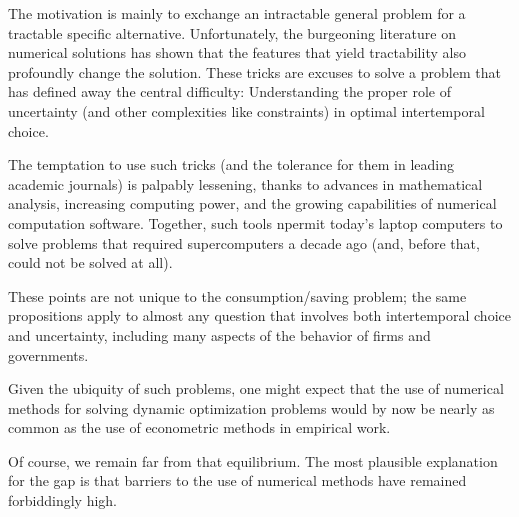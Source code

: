 \documentclass[titlepage]{\econtex}
\begin{document}
The motivation is mainly to exchange an intractable general problem
for a tractable specific alternative.  Unfortunately, the burgeoning
literature on numerical solutions has shown that the features that
yield tractability also profoundly change the solution.  These tricks
are excuses to solve a problem that has defined away the central
difficulty: Understanding the proper role of uncertainty (and other
complexities like constraints) in optimal intertemporal choice.

The temptation to use such tricks (and the tolerance for them in
leading academic journals) is palpably lessening, thanks to advances in
mathematical analysis, increasing computing power, and the growing
capabilities of numerical computation software.  Together, such tools
npermit today's laptop computers to solve problems that required
supercomputers a decade ago (and, before that, could not be solved at
all).

These points are not unique to the consumption/saving problem; the
same propositions apply to almost any question that involves both
intertemporal choice and uncertainty, including many aspects of the
behavior of firms and governments.  

Given the ubiquity of such problems, one might expect that the use of
numerical methods for solving dynamic optimization problems would by
now be nearly as common as the use of econometric methods in empirical
work.  

Of course, we remain far from that equilibrium.  The most plausible 
explanation for the gap is that barriers to the use of numerical 
methods have remained forbiddingly high.  

   
   
   
   
\end{document}
